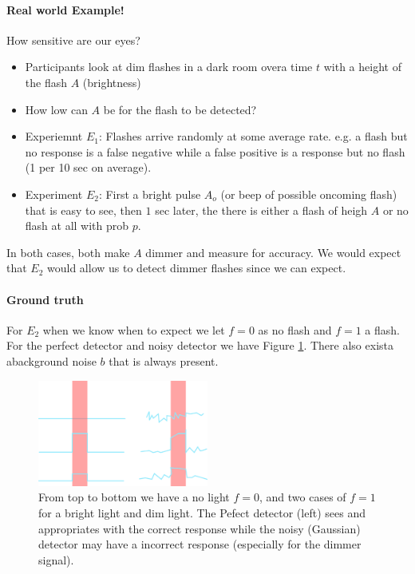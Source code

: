 \documentclass[../main.tex]{subfiles}
\begin{document}
\paragraph{Real world Example!} How sensitive are our eyes? 
\begin{itemize}
    \item Participants look at dim flashes in a dark room overa time $t$ with a height of the flash
    $A$ (brightness)
    \item How low can $A$ be for the flash to be detected?
    \item Experiemnt $E_1$: Flashes arrive randomly at some average rate. e.g. a flash but no response
    is a false negative while a false positive is a response but no flash (1 per 10 sec on average).
    \item Experiment $E_2$: First a bright pulse $A_o$ (or beep of possible oncoming flash) that is easy to see, then $1$ sec later, the 
    there is either a flash of heigh $A$ or no flash at all with prob $p$. 
\end{itemize}
In both cases, both make $A$ dimmer and measure for accuracy. We would expect that $E_2$ would allow
us to detect dimmer flashes since we can expect. 

\paragraph*{Ground truth} For $E_2$ when we know when to expect we let $f = 0$ as no flash
and $f = 1$ a flash. For the perfect detector and noisy detector we have Figure \ref{fig:flash}. 
There also exista abackground noise $b$ that is always present. 

\begin{figure}[ht]
    \centering
    \includegraphics[width=0.5\textwidth]{images/sense.png}
    \caption{From top to bottom we have a no light $f=0$, and two cases of $f = 1$ for a bright
    light and dim light. The Pefect detector (left) sees and appropriates with the correct response
    while the noisy (Gaussian) detector may have a incorrect response (especially for the dimmer
    signal).}
    \label{fig:flash}
\end{figure}
\end{document}
